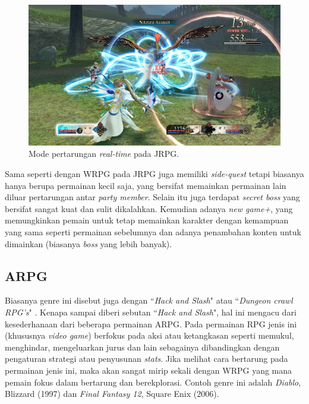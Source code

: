 \begin{subs}
	\begin{figure} [!h] \centering
		\includegraphics[scale=0.26]{img/tales.png}
		\caption{Mode pertarungan \textit{real-time} pada JRPG.}
		\label{fig:tales}
	\end{figure}
	
	Sama seperti dengan WRPG pada JRPG juga memiliki \textit{side-quest} tetapi biasanya hanya berupa permainan kecil saja, yang bersifat memainkan permainan lain diluar pertarungan antar \textit{party member}. Selain itu juga terdapat \textit{secret boss} yang bersifat sangat kuat dan sulit dikalahkan. Kemudian adanya \textit{new game+}, yang memungkinkan pemain untuk tetap memainkan karakter dengan kemampuan yang sama seperti permainan sebelumnya dan adanya penambahan konten untuk dimainkan (biasanya \textit{boss} yang lebih banyak).
	\vspace{1ex}
	
	\subsection{ARPG}
	\label{sec:sub_sec2_arpg}
	
	Biasanya genre ini disebut juga dengan ``\textit{Hack and Slash}" atau ``\textit{Dungeon crawl RPG's}" \citep{moore2016}. Kenapa sampai diberi sebutan ``\textit{Hack and Slash}", hal ini mengacu dari kesederhanaan dari beberapa permainan ARPG. Pada permainan RPG jenis ini (khususnya \textit{video game}) berfokus pada aksi atau ketangkasan seperti memukul, menghindar, mengeluarkan jurus dan lain sebagainya dibandingkan dengan pengaturan strategi atau penyusunan \textit{stats}. Jika melihat cara bertarung pada permainan jenis ini, maka akan sangat mirip sekali dengan WRPG yang mana pemain fokus dalam bertarung dan berekplorasi. Contoh genre ini adalah \textit{Diablo}, Blizzard (1997) dan \textit{Final Fantasy 12}, Square Enix (2006).
	\vspace{1ex}
	

\end{subs}
